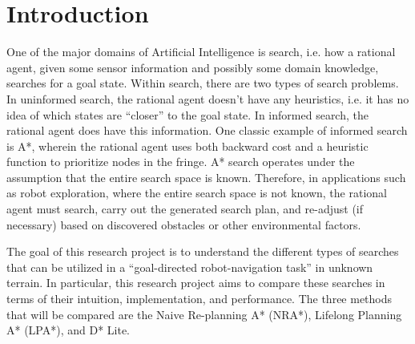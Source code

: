 
\section{Introduction}
	One of the major domains of Artificial Intelligence is search, i.e. how a rational agent, given some sensor information and possibly some domain knowledge, searches for a goal state. Within search, there are two types of search problems. In uninformed search, the rational agent doesn't have any heuristics, i.e. it has no idea of which states are ``closer'' to the goal state. In informed search, the rational agent does have this information. 
	One classic example of informed search is A*, wherein the rational agent uses both backward cost and a heuristic function to prioritize nodes in the fringe. A* search operates under the assumption that the entire search space is known. Therefore, in applications such as robot exploration, where the entire search space is not known, the rational agent must search, carry out the generated search plan, and re-adjust (if necessary) based on discovered obstacles or other environmental factors.
	
	The goal of this research project is to understand the different types of searches that can be utilized in a ``goal-directed robot-navigation task'' in unknown terrain. In particular, this research project aims to compare these searches in terms of their intuition, implementation, and performance. The three methods that will be compared are the Naive Re-planning A* (NRA*), Lifelong Planning A* (LPA*), and D* Lite.
